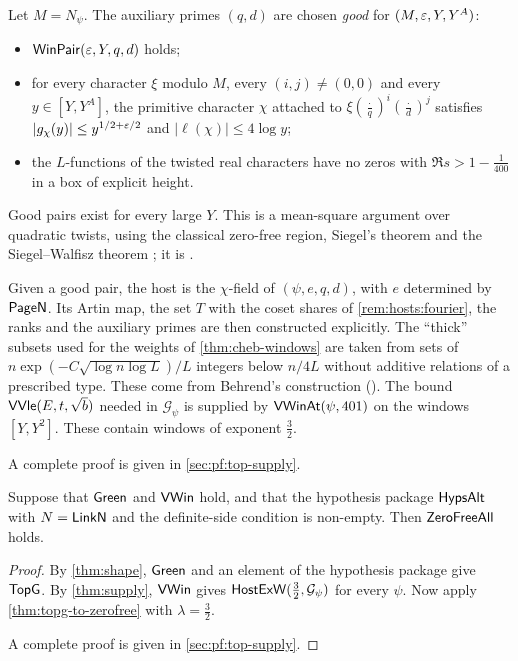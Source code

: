 \begin{proofoutline}
Let $M=N_\psi$. The auxiliary primes $(q,d)$ are chosen \emph{good} for $(M,\varepsilon,Y,Y^A)$:
\begin{itemize}
\item $\mathsf{WinPair}(\varepsilon,Y,q,d)$ holds;
\item for every character $\xi$ modulo $M$, every $(i,j)\ne(0,0)$ and every $y\in[Y,Y^A]$, the
primitive character $\chi$ attached to $\xi(\frac\cdot q)^i(\frac\cdot d)^j$ satisfies
$|g_\chi(y)|\le y^{1/2+\varepsilon/2}$ and $|\ell(\chi)|\le4\log y$;
\item the $L$-functions of the twisted real characters have no zeros with $\Re s>1-\frac1{400}$ in a
box of explicit height.
\end{itemize}
Good pairs exist for every large $Y$. This is a mean-square argument over quadratic twists, using the
classical zero-free region, Siegel's theorem and the Siegel--Walfisz theorem
\cite{Davenport2000,IwaniecKowalski2004}; it is
.

Given a good pair, the host is the $\chi$-field of $(\psi,e,q,d)$, with $e$ determined by
$\mathsf{PageN}$. Its Artin map, the set $T$ with the coset shares of \cref{rem:hosts:fourier}, the
ranks and the auxiliary primes are then constructed explicitly. The ``thick'' subsets used for the weights
of \cref{thm:cheb-windows} are taken from sets of $n\exp(-C\sqrt{\log n\log L})/L$ integers below $n/4L$
without additive relations of a prescribed type. These come from Behrend's construction
\cite{Behrend1946} (). The bound
$\mathsf{VVle}(E,t,\sqrt{b})$ needed in $\mathcal G_\psi$ is supplied by $\mathsf{VWinAt}(\psi,401)$ on
the windows $[Y,Y^2]$. These contain windows of exponent $\frac32$.

A complete proof is given in \cref{sec:pf:top-supply}.
\end{proofoutline}

\begin{theorem}\label{thm:top-deduction}
Suppose that $\mathsf{Green}$ and $\mathsf{VWin}$ hold, and that the hypothesis package
$\mathsf{HypsAlt}$ with $N=\mathsf{LinkN}$ and the definite-side condition is non-empty. Then
$\mathsf{ZeroFreeAll}$ holds. 
\end{theorem}

\begin{proof}
By \cref{thm:shape}, $\mathsf{Green}$ and an element of the hypothesis package give $\mathsf{TopG}$.
By \cref{thm:supply}, $\mathsf{VWin}$ gives $\mathsf{HostExW}(\frac32,\mathcal G_\psi)$ for every
$\psi$. Now apply \cref{thm:topg-to-zerofree} with $\lambda=\frac32$.

A complete proof is given in \cref{sec:pf:top-supply}.
\end{proof}

